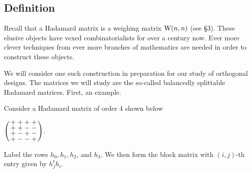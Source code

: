 \documentclass[../../../main]{subfiles}
\begin{document}
\subsection{Definition}

 Recall that a Hadamard matrix is a weighing matrix $\text{W}(n,n)$ (see \S3). These elusive objects have vexed combinatorialists for over a century now. Ever more clever techniques from ever more branches of mathematics are needed in order to construct these objects. 
 
 We will consider one such construction in preparation for our study of orthogonal designs. The matrices we will study are the so-called balancedly splittable Hadamard matrices. First, an example.
 
 \begin{ex}\label{bal-split-hadamard-ex}
  Consider a Hadamard matrix of order 4 shown below
  \begin{defenum}
  \item\label{H(4)} $\arraycolsep=1.25pt\def\arraystretch{0.625}
   \left(\begin{array}{cccc}
    + & + & + & + \\
    + & + & - & - \\
    + & - & + & - \\
    + & - & - & +
   \end{array}\right)$.
  \end{defenum}
  Label the rows $h_0, h_1, h_2$, and $h_3$. We then form the block matrix with $(i,j)$-th entry given by $h_j^th_i$.
\end{ex}
\end{document}

